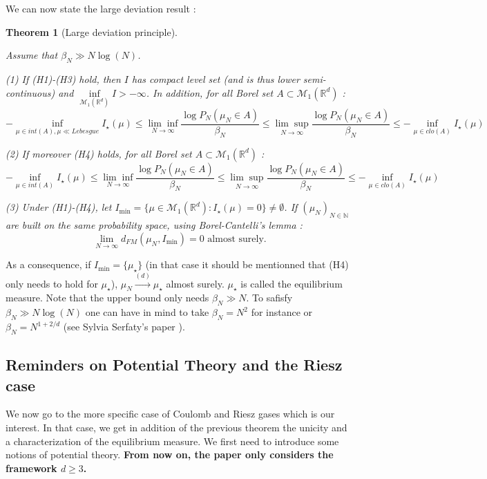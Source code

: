 \documentclass[a4paper,12pt]{report}
\newtheorem{thm}{Theorem}
\begin{document}
We can now state the large deviation result :

\begin{thm}[Large deviation principle]\label{cgz:ldp}

    Assume that $\beta_{N} \gg N\log(N)$.
    
    (1) If (H1)-(H3) hold, then $I$ has compact level set (and is thus lower semi-continuous) and $\underset{\mathcal{M}_{1}(\mathbb{R}^{d})}{\inf} I > - \infty$. In addition, for all Borel set $A \subset \mathcal{M}_{1}(\mathbb{R}^{d})$ : 
    \[-\underset{\mu \in int(A), \mu \ll Lebesgue}{\inf} I_{\star}(\mu) \leq \underset{N \longrightarrow\infty}{\lim \inf} \frac{\log P_{N}(\mu_{N} \in A)}{\beta_{N}}\leq \underset{N \longrightarrow\infty}{\lim \sup} \frac{\log P_{N}(\mu_{N} \in A)}{\beta_{N}} \leq -\underset{\mu \in clo(A)}{\inf} I_{\star}(\mu)\]
    
    (2) If moreover (H4) holds, for all Borel set $A \subset \mathcal{M}_{1}(\mathbb{R}^{d})$ : 
    \[-\underset{\mu \in int(A)}{\inf} I_{\star}(\mu) \leq \underset{N \longrightarrow\infty}{\lim \inf} \frac{\log P_{N}(\mu_{N} \in A)}{\beta_{N}}\leq \underset{N \longrightarrow\infty}{\lim \sup} \frac{\log P_{N}(\mu_{N} \in A)}{\beta_{N}} \leq -\underset{\mu \in clo(A)}{\inf} I_{\star}(\mu)\]
    
    (3) Under (H1)-(H4), let $I_{\min} = \{\mu \in \mathcal{M}_{1}(\mathbb{R}^{d}) : I_{\star}(\mu) = 0\} \neq \emptyset$. If $(\mu_{N})_{N \in \mathbb{N}}$ are built on the same probability space, using Borel-Cantelli's lemma :
    \[\underset{N \longrightarrow \infty}{\lim} d_{FM}(\mu_{N}, I_{\min}) = 0 \text{  almost surely.}\]
\end{thm}

As a consequence, if $I_{\min} = \{\mu_{\star}\}$ (in that case it should be mentionned that (H4) only needs to hold for $\mu_{\star}$), $\mu_{N} \overset{(d)}{\longrightarrow} \mu_{\star}$ almost surely. $\mu_{\star}$ is called the equilibrium measure. Note that the upper bound only needs $\beta_{N} \gg N$. To safisfy $\beta_{N} \gg N\log(N)$ one can have in mind to take $\beta_{N} = N^{2}$ for instance or $\beta_{N} = N^{1+2/d}$ (see Sylvia Serfaty's paper \cite{serfaty2020}).

\subsection{Reminders on Potential Theory and the Riesz case}

We now go to the more specific case of Coulomb and Riesz gases which is our interest. In that case, we get in addition of the previous theorem the unicity and a characterization of the equilibrium measure. We first need to introduce some notions of potential theory. \textbf{From now on, the paper only considers the framework $d \geq 3$.}
\end{document}

